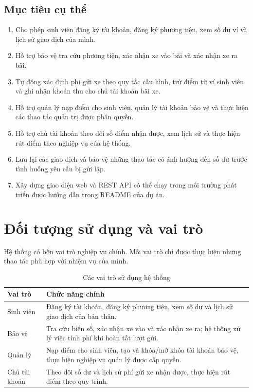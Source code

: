\subsection{Mục tiêu cụ thể}
\begin{enumerate}[label=\arabic*)]
    \item Cho phép sinh viên đăng ký tài khoản, đăng ký phương tiện, xem số dư ví và lịch sử giao dịch của mình.
    \item Hỗ trợ bảo vệ tra cứu phương tiện, xác nhận xe vào bãi và xác nhận xe ra bãi.
    \item Tự động xác định phí gửi xe theo quy tắc cấu hình, trừ điểm từ ví sinh viên và ghi nhận khoản thu cho chủ tài khoản bãi xe.
    \item Hỗ trợ quản lý nạp điểm cho sinh viên, quản lý tài khoản bảo vệ và thực hiện các thao tác quản trị được phân quyền.
    \item Hỗ trợ chủ tài khoản theo dõi số điểm nhận được, xem lịch sử và thực hiện rút điểm theo nghiệp vụ của hệ thống.
    \item Lưu lại các giao dịch và bảo vệ những thao tác có ảnh hưởng đến số dư trước tình huống yêu cầu bị gửi lặp.
    \item Xây dựng giao diện web và REST API có thể chạy trong môi trường phát triển được hướng dẫn trong README của dự án.
\end{enumerate}

\section{Đối tượng sử dụng và vai trò}

Hệ thống có bốn vai trò nghiệp vụ chính. Mỗi vai trò chỉ được thực hiện những thao tác phù hợp với nhiệm vụ của mình.

\begin{table}[htbp]
\centering
\caption{Các vai trò sử dụng hệ thống}
\label{tab:roles}
\begin{tabular}{|p{3cm}|p{10cm}|}
\hline
\textbf{Vai trò} & \textbf{Chức năng chính} \\ \hline
Sinh viên & Đăng ký tài khoản, đăng ký phương tiện, xem số dư và lịch sử giao dịch của bản thân. \\ \hline
Bảo vệ & Tra cứu biển số, xác nhận xe vào và xác nhận xe ra; hệ thống xử lý việc tính phí khi hoàn tất lượt gửi. \\ \hline
Quản lý & Nạp điểm cho sinh viên, tạo và khóa/mở khóa tài khoản bảo vệ, thực hiện nghiệp vụ quản lý được cấp quyền. \\ \hline
Chủ tài khoản & Theo dõi số dư và lịch sử phí gửi xe nhận được, thực hiện rút điểm theo quy trình. \\ \hline
\end{tabular}
\end{table}

